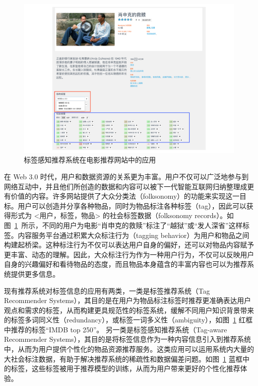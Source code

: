 
\begin{figure}[!h]
    \centering
    \setlength{\belowcaptionskip}{-6mm}
    \includegraphics[width=1\linewidth]{figure/movie.pdf}
    \caption{标签感知推荐系统在电影推荐网站中的应用}
    \label{fig:movielen}
\end{figure}

在 Web 3.0 时代，用户和数据资源的关系更为丰富。用户不仅可以广泛地参与到网络互动中，并且他们所创造的数据和内容可以被下一代智能互联网归纳整理成更有价值的内容\cite{hutchison_information_2006}。许多网站提供了大众分类法（folksonomy）的功能来实现这一目标。用户可以创造并分享各种物品，同时为物品标注各种标签（tag），因此可以获得形式为 <用户，标签，物品> 的社会标签数据（folksonomy records）。如图~\ref{fig:movielen}~所示，不同的用户为电影“肖申克的救赎”标注了“越狱”或“发人深省”这样标签。内容服务平台通过积累大众标注行为（tagging behavior）为用户和物品之间构建起桥梁。这种标注行为不仅可以表达用户自身的偏好，还可以对物品内容赋予更丰富、动态的理解。因此，大众标注行为作为一种用户行为，不仅可以反映用户自身的兴趣偏好和看待物品的态度，而且物品本身蕴含的丰富内容也可以为推荐系统提供更多信息。

现有推荐系统对标签信息的应用有两类，一类是标签推荐系统（Tag Recommender Systems），其目的是在用户为物品标注标签时推荐更准确表达用户观点和需求的标签，从而构建更具规范性的标签系统，缓解不同用户知识背景带来的标签多词同义性（redundancy），或标签一词多义性（ambiguity），如图~\ref{fig:movielen} 红框中推荐的标签“IMDB top 250”。
另一类是标签感知推荐系统（Tag-aware Recommender Systems），其目的是将标签信息作为一种内容信息引入到推荐系统中，从而为用户提供个性化的物品资源推荐服务。这类应用可以运用系统内大量的大社会标注数据，有助于解决推荐系统的稀疏性和数据偏差问题。如图~\ref{fig:movielen} 蓝框中的标签，这些标签被用于推荐模型的训练，从而为用户带来更好的个性化推荐体验。

